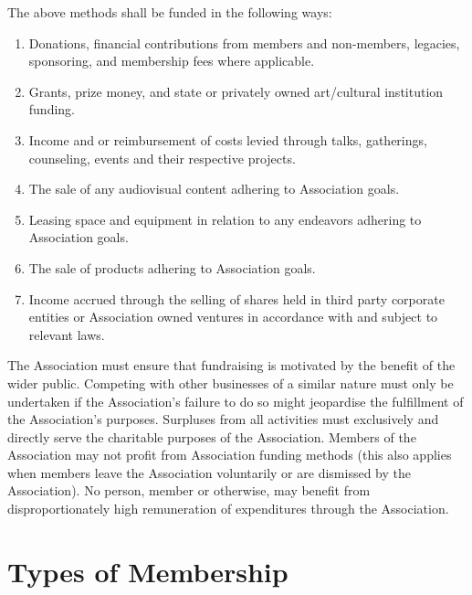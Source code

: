 The above methods shall be funded in the following ways:

\begin{enumerate}
\item Donations, financial contributions from members and non-members, legacies, sponsoring, and membership fees where applicable.
\item Grants, prize money, and state or privately owned art/cultural institution funding.
\item Income and or reimbursement of costs levied through talks, gatherings, counseling, events and their respective projects.
\item The sale of any audiovisual content adhering to Association goals.
\item Leasing space and equipment in relation to any endeavors adhering to Association goals.
\item The sale of products adhering to Association goals.
\item Income accrued through the selling of shares held in third party corporate entities or Association owned ventures in accordance with and subject to relevant laws.
\end{enumerate}

The Association must ensure that fundraising is motivated by the benefit of the wider public. Competing with other businesses of a similar nature must only be undertaken if the Association’s failure to do so might jeopardise the fulfillment of the Association’s purposes. Surpluses from all activities must exclusively and directly serve the charitable purposes of the Association. Members of the Association may not profit from Association funding methods (this also applies when members leave the Association voluntarily or are dismissed by the Association). No person, member or otherwise, may benefit from disproportionately high remuneration of expenditures through the Association.\\





\section{Types of Membership}


